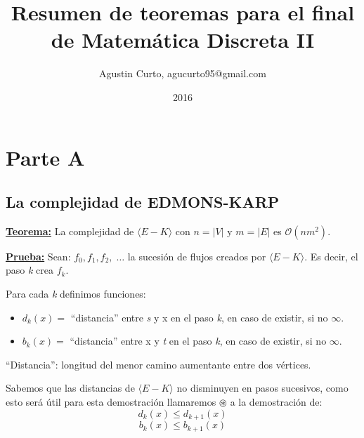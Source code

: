 \documentclass[12pt,a4paper]{report}
\author{Agustin Curto, agucurto95@gmail.com}
\title{Resumen de teoremas para el final \\ de Matemática Discreta  II}
\date{2016}
\providecommand{\abs}[1]{\lvert#1\rvert}
\begin{document}
\maketitle
\tableofcontents


\chapter{Parte A}

	\section{La complejidad de EDMONS-KARP}
		\textbf{\underline{Teorema:}} La complejidad de $\langle E-K \rangle$ con $n = \abs{V}$ y $m = \abs{E}$ es $\mathcal{O}(nm^{2})$.

		\textbf{\underline{Prueba:}} Sean: $f_{0}, f_{1}, f_{2}, \; \dotsc$ \; la sucesión de flujos creados por $\langle E-K \rangle$. Es decir, el paso \textit{k} crea $f_{k}$.
			\vspace{5mm}
			\par Para cada \textit{k} definimos funciones:
			\begin{itemize}
				\item $d_{k}(x) =$ \textquotedblleft distancia\textquotedblright \; entre \textit{s} y x en el paso \textit{k}, en caso de existir, si no $\infty$.
				\item $b_{k}(x) =$ \textquotedblleft distancia\textquotedblright \; entre x y \textit{t} en el paso \textit{k}, en caso de existir, si no $\infty$.
			\end{itemize}

			\textquotedblleft Distancia\textquotedblright: longitud del menor camino aumentante entre dos vértices.

			\vspace{5mm}
			\par Sabemos que las distancias de $\langle E-K \rangle$ no disminuyen en pasos sucesivos, como esto será útil para esta demostración llamaremos $\circledast$ a la demostración de:
				\[ d_{k}(x) \leq d_{k+1}(x) \]
				\[ b_{k}(x) \leq b_{k+1}(x) \]
\end{document}
